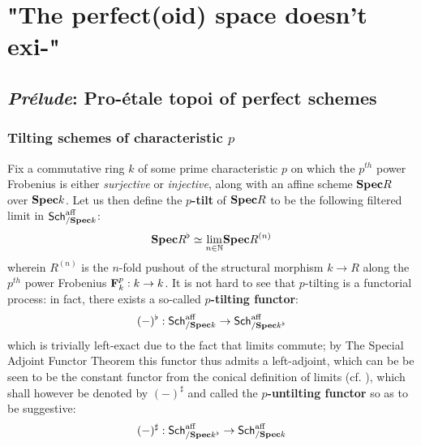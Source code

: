     \section{"The perfect(oid) space doesn't exi-"}
        \subsection{\textit{Pr\'elude}: Pro-\'etale topoi of perfect schemes}
            \subsubsection{Tilting schemes of characteristic \texorpdfstring{$p$}{}}
                \begin{definition} \label{def: tilting_schemes}
                    Fix a commutative ring $k$ of some prime characteristic $p$ on which the $p^{th}$ power Frobenius is either \textit{surjective} or \textit{injective}, along with an affine scheme $\mathbf{Spec} R$ over $\mathbf{Spec} k$. Let us then define the \textbf{$p$-tilt} of $\mathbf{Spec} R$ to be the following filtered limit in $\mathsf{Sch}^{\mathrm{aff}}_{/\mathbf{Spec} k}$:
                        $$\mathbf{Spec} R^{\flat} \simeq \underset{n \in \mathbb{N}}{\operatorname{lim}} \mathbf{Spec} R^{(n)}$$
                    wherein $R^{(n)}$ is the $n$-fold pushout of the structural morphism $k \to R$ along the $p^{th}$ power Frobenius $\mathbf{F}_k^p: k \to k$. It is not hard to see that $p$-tilting is a functorial process: in fact, there exists a so-called \textbf{$p$-tilting functor}:
                        $$(-)^{\flat}: \mathsf{Sch}^{\mathrm{aff}}_{/\mathbf{Spec} k} \to \mathsf{Sch}^{\mathrm{aff}}_{/\mathbf{Spec} k^{\flat}}$$
                    which is trivially left-exact due to the fact that limits commute; by The Special Adjoint Functor Theorem \cite[Theorem V.8.2]{maclane} this functor thus admits a left-adjoint, which can be be seen to be the constant functor from the conical definition of limits (cf. \cite[Section 3]{nlab:limit}), which shall however be denoted by $(-)^{\sharp}$ and called the \textbf{$p$-untilting functor} so as to be suggestive:
                        $$(-)^{\sharp}: \mathsf{Sch}^{\mathrm{aff}}_{/\mathbf{Spec} k^{\flat}} \to \mathsf{Sch}^{\mathrm{aff}}_{/\mathbf{Spec} k}$$
                \end{definition}
